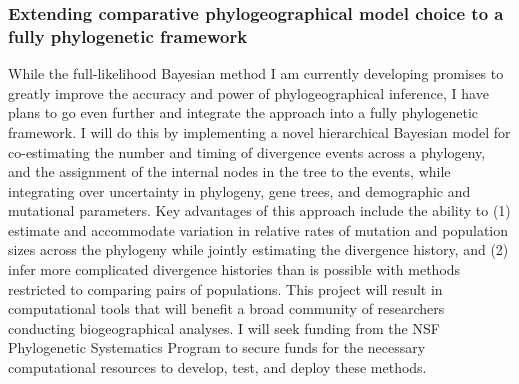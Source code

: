\subsubsection*{Extending comparative phylogeographical model choice to a fully
    phylogenetic framework}
While the full-likelihood Bayesian method I am currently developing promises to
greatly improve the accuracy and power of phylogeographical inference, I have
plans to go even further and integrate the approach into a fully phylogenetic
framework.
I will do this by implementing a novel hierarchical Bayesian model for
co-estimating the number and timing of divergence events across a phylogeny,
and the assignment of the internal nodes in the tree to the events, while
integrating over uncertainty in phylogeny, gene trees, and demographic and
mutational parameters.
Key advantages of this approach include the ability to
(1) estimate and accommodate variation in relative rates of mutation and
population sizes across the phylogeny while jointly estimating the divergence
history, and
(2) infer more complicated divergence histories than is possible with methods
restricted to comparing pairs of populations.
This project will result in computational tools that will benefit a broad
community of researchers conducting biogeographical analyses. I will seek
funding from the NSF Phylogenetic Systematics Program to secure funds for the
necessary computational resources to develop, test, and deploy these methods.


